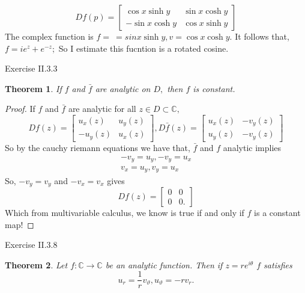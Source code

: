 \documentclass[letter]{article}
\newtheorem{theorem}{Theorem}
\newenvironment{menumerate}{%
  \edef\backupindent{\the\parindent}%
  \enumerate%
  \setlength{\parindent}{\backupindent}%
}{\endenumerate}
\begin{document}
\begin{menumerate}
\begin{equation}
 		Df(p) = \begin{bmatrix}
 			\cos x \sinh y & \sin x \cosh y \\
 			-\sin x \cosh y & \cos x \sinh y
 		\end{bmatrix}
 	\end{equation}
 	The complex function is $f = \ = sin x \sinh y, v = \cos x \cosh y$. It follows that, $f = ie^z +e^{-z};$ So I estimate this fucntion is a rotated cosine.
 	\item Exercise II.3.3
 	\begin{theorem}
 		If $f$ and $\bar f$ are analytic on $D,$ then $f$ is constant.
 	\end{theorem}
 	\begin{proof}
 		If $f$ and $\bar f$ are analytic for all $z \in D \subset \mathbb{C},$
 		\begin{equation}
 			Df(z) = \begin{bmatrix}
 				u_x(z) & u_y(z) \\
 				-u_y(z) & u_x(z)
 			\end{bmatrix},
 			 D\bar f(z)= \begin{bmatrix}
 			 	u_x(z) & -v_y(z) \\
 			 	u_y(z) &  -v_y(z)
 			 \end{bmatrix}
 		\end{equation}
 		So by the cauchy riemann equations we have that,
 		$\bar f$ and $f$ analytic implies 
 		\begin{align}
 			-v_y = u_y, -v_y = u_x \\
 			v_x = u_y, v_y = u_x
 		\end{align}
 		So, $-v_y = v_y$ and $-v_x = v_x$ gives
 		\begin{equation}
 			Df(z) = \begin{bmatrix}
 				0 & 0\\
 				0 & 0.
 			\end{bmatrix} 
 		\end{equation}
 		Which from multivariable calculus, we know is true if and only if
 		$f$ is a constant map!
 	\end{proof}
 	\item Exercise II.3.8
 	\begin{theorem}
 		Let $f: \mathbb{C} \to \mathbb{C}$ be an analytic function. Then if
 		$z = re^{i\theta}$ $f$ satisfies
 		\begin{equation}
 		u_r = \frac{1}{r} v_\vartheta, u_\vartheta = -rv_r.
 		\end{equation}
 	\end{theorem}

\end{menumerate}
\end{document}
